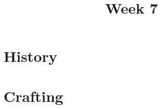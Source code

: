 \documentclass[11pt]{article}
\title{Week 7}
\date{}
\begin{document}
    \maketitle

    \section*{History}
        \begin{itemize}
        \end{itemize}

    \section*{Crafting}
        \begin{itemize}
        \end{itemize}
\end{document}
